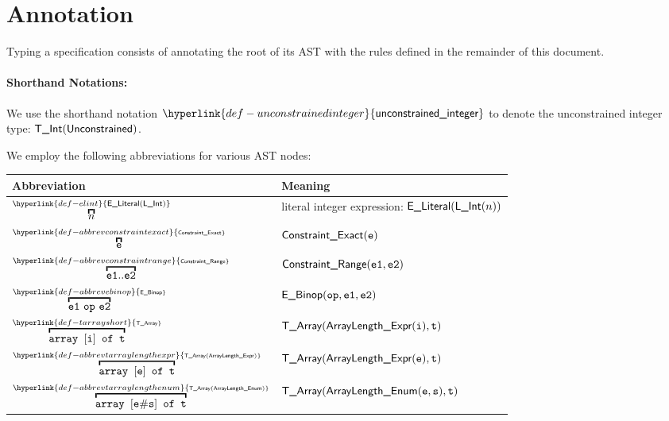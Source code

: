 \documentclass{book}
\newcommand\unconstrainedinteger[0]{\hyperlink{def-unconstrainedinteger}{\textsf{unconstrained\_integer}}}
\newcommand\ELInt[1]{\overbracket{#1}^{\hyperlink{def-elint}{\ELiteral(\lint)}}}
\newcommand\AbbrevConstraintExact[1]{\overbracket{#1}^{\hyperlink{def-abbrevconstraintexact}{\scriptscriptstyle{\ConstraintExact}}}}
\newcommand\AbbrevConstraintRange[2]{\overbracket{#1..#2}^{\hyperlink{def-abbrevconstraintrange}{\scriptscriptstyle{\ConstraintRange}}}}
\newcommand\AbbrevEBinop[3]{\overbracket{#2\ #1\ #3}^{\hyperlink{def-abbrevebinop}{\scriptscriptstyle{\EBinop}}}}
\newcommand\AbbrevTArray[2]{\overbracket{\texttt{array }[#1]\texttt{ of }#2}^{\hyperlink{def-tarrayshort}{\scriptscriptstyle{\TArray}}}}
\newcommand\AbbrevTArrayLengthExpr[2]{\overbracket{\texttt{array }[#1]\texttt{ of }#2}^{\hyperlink{def-abbrevtarraylengthexpr}{\scriptscriptstyle{\TArray(\ArrayLengthExpr)}}}}
\newcommand\AbbrevTArrayLengthEnum[3]{\overbracket{\texttt{array }[#1 \# #2]\texttt{ of }#3}^{\hyperlink{def-abbrevtarraylengthenum}{\scriptscriptstyle{\TArray(\ArrayLengthEnum)}}}}
\newcommand\annotatestmt[0]{\hyperlink{def-annotatestmt}{\textfunc{annotate\_stmt}}}
\begin{document}

\section{Annotation}

Typing a specification consists of annotating the root of its AST with the rules defined
in the remainder of this document.

\paragraph{Shorthand Notations:}

\hypertarget{def-unconstrainedinteger}{}
We use the shorthand notation $\unconstrainedinteger$ to denote the unconstrained integer type: $\textsf{T\_Int}(\textsf{Unconstrained})$.

We employ the following abbreviations for various AST nodes:
\begin{center}
\begin{tabular}{ll}
\hline
\textbf{Abbreviation} & \textbf{Meaning}
\hypertarget{def-elint}{}\\
\hline
$\ELInt{n}$ & literal integer expression: $\textsf{E\_Literal}(\textsf{L\_Int}(n))$
\hypertarget{def-abbrevconstraintexact}{}\\
$\AbbrevConstraintExact{\ve}$ & $\textsf{Constraint\_Exact}(\texttt{e})$
\hypertarget{def-abbrevconstraintrange}{}\\
$\AbbrevConstraintRange{\veone}{\vetwo}$ & $\textsf{Constraint\_Range}(\texttt{e1}, \texttt{e2})$ \hypertarget{def-abbrevebinop}{}\\
$\AbbrevEBinop{\op}{\veone}{\vetwo}$ & $\textsf{E\_Binop}(\texttt{op}, \texttt{e1}, \texttt{e2})$ \hypertarget{def-abbrevtarraylengthexpr}{}\\
$\AbbrevTArray{\vi}{\vt}$ & $\textsf{T\_Array}(\textsf{ArrayLength\_Expr}(\texttt{i}), \texttt{t})$ \hypertarget{def-abbrevtarray}{}\\
$\AbbrevTArrayLengthExpr{\ve}{\vt}$ & $\textsf{T\_Array}(\textsf{ArrayLength\_Expr}(\texttt{e}), \texttt{t})$ \hypertarget{def-abbrevtarraylengthenum}{}\\
$\AbbrevTArrayLengthEnum{\ve}{\vs}{\vt}$ & $\textsf{T\_Array}(\textsf{ArrayLength\_Enum}(\texttt{e}, \texttt{s}), \texttt{t})$\\
\hline
\end{tabular}
\end{center}
\end{document}

